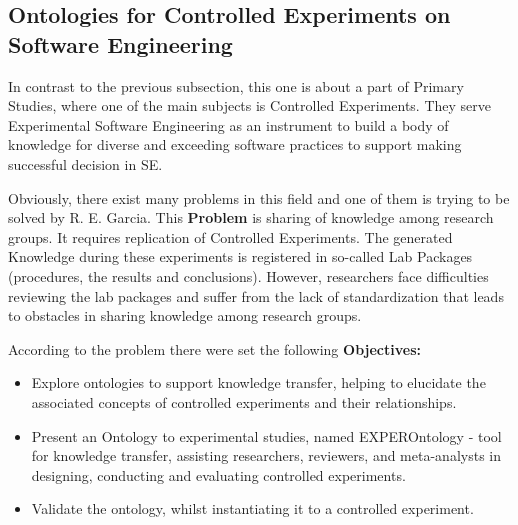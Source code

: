 	
	\subsection{Ontologies for Controlled Experiments on Software Engineering}
	In contrast to the previous subsection, this one is about a part of Primary Studies, where one of the main subjects is Controlled Experiments. They serve Experimental Software Engineering as an instrument to build a body of knowledge for diverse and exceeding software practices to support making successful decision in SE. \newline
	
	Obviously, there exist many problems in this field and one of them is trying to be solved by R. E. Garcia\cite{Gar08}. This \textbf{Problem} is sharing of knowledge among research groups. It requires replication of Controlled Experiments. The generated Knowledge during these experiments is registered in so-called Lab Packages (procedures, the results and conclusions). However, researchers face difficulties reviewing the lab packages and suffer from the lack of standardization that leads to obstacles in sharing knowledge among research groups. \newline
	
	According to the problem there were set the following \textbf{Objectives:}
		\begin{itemize}
			\item Explore ontologies to support knowledge transfer,
			helping to elucidate the associated concepts of controlled
			experiments and their relationships.
			\item Present an Ontology to experimental studies, named EXPEROntology - tool
			for knowledge transfer, assisting researchers, reviewers,
			and meta-analysts in designing, conducting and evaluating
			controlled experiments.
			\item Validate the ontology, whilst instantiating it to a controlled experiment.
		\end{itemize}
	  
